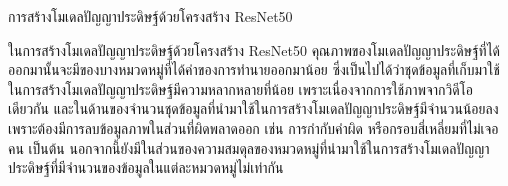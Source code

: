 การสร้างโมเดลปัญญาประดิษฐ์ด้วยโครงสร้าง ResNet50
\par
ในการสร้างโมเดลปัญญาประดิษฐ์ด้วยโครงสร้าง ResNet50 คุณภาพของโมเดลปัญญาประดิษฐ์ที่ได้ออกมานั้นจะมีของบางหมวดหมู่ที่ได้ค่าของการทำนายออกมาน้อย ซึ่งเป็นไปได้ว่าชุดข้อมูลที่เก็บมาใช้ในการสร้างโมเดลปัญญาประดิษฐ์มีความหลากหลายที่น้อย เพราะเนื่องจากการใช้ภาพจากวิดีโอเดียวกัน และในด้านของจำนวนชุดข้อมูลที่นำมาใช้ในการสร้างโมเดลปัญญาประดิษฐ์มีจำนวนน้อยลง เพราะต้องมีการลบข้อมูลภาพในส่วนที่ผิดพลาดออก เช่น การกำกับคำผิด หรือกรอบสี่เหลี่ยมที่ไม่เจอคน เป็นต้น นอกจากนี้ยังมีในส่วนของความสมดุลของหมวดหมู่ที่นำมาใช้ในการสร้างโมเดลปัญญาประดิษฐ์ที่มีจำนวนของข้อมูลในแต่ละหมวดหมู่ไม่เท่ากัน
